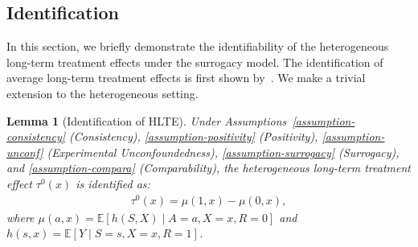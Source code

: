 \documentclass{article}
\theoremstyle{plain}
\newtheorem{lemma}[theorem]{Lemma}
\theoremstyle{definition}
\theoremstyle{remark}
\newcommand{\1}{\mathds{1}}                %
\begin{document}
\subsection{Identification}
\label{app:identification}
In this section, we briefly demonstrate the identifiability of the heterogeneous long-term treatment effects under the surrogacy model. The identification of average long-term treatment effects is first shown by~\cite{Athey.2025}. We make a trivial extension to the heterogeneous setting. 
\begin{lemma}[Identification of HLTE]
    Under Assumptions~\ref{assumption-consistency} (Consistency), \ref{assumption-positivity} (Positivity), \ref{assumption-unconf} (Experimental Unconfoundedness), \ref{assumption-surrogacy} (Surrogacy), and \ref{assumption-compara} (Comparability), the heterogeneous long-term treatment effect $\tau^0(x)$ is identified as:
    \begin{align}
        \tau^0(x) = \mu(1,x) - \mu(0,x),
    \end{align}
    where $\mu(a,x) = \mathbb{E}[h(S,X) \mid A=a, X=x, R=0]$ and $h(s,x) = \mathbb{E}[Y \mid S=s, X=x, R=1]$.
\end{lemma}
\end{document}
